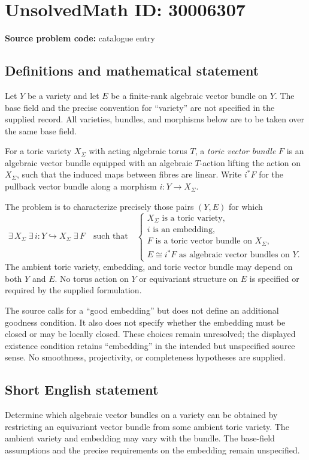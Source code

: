 \documentclass[11pt]{article}
\begin{document}
\section*{UnsolvedMath ID: 30006307}
\textbf{Source problem code:} catalogue entry
\subsection{Definitions and mathematical statement}
Let \(Y\) be a variety and let \(E\) be a finite-rank algebraic vector bundle on \(Y\). The base field and the precise convention for ``variety'' are not specified in the supplied record. All varieties, bundles, and morphisms below are to be taken over the same base field.

For a toric variety \(X_\Sigma\) with acting algebraic torus \(T\), a \emph{toric vector bundle} \(F\) is an algebraic vector bundle equipped with an algebraic \(T\)-action lifting the action on \(X_\Sigma\), such that the induced maps between fibres are linear. Write \(i^*F\) for the pullback vector bundle along a morphism \(i:Y\to X_\Sigma\).

The problem is to characterize precisely those pairs \((Y,E)\) for which
\[
\exists\,X_\Sigma\;\exists\,i:Y\hookrightarrow X_\Sigma\;\exists\,F
\quad\text{such that}\quad
\begin{cases}
X_\Sigma\text{ is a toric variety},\\
i\text{ is an embedding},\\
F\text{ is a toric vector bundle on }X_\Sigma,\\
E\cong i^*F\text{ as algebraic vector bundles on }Y.
\end{cases}
\]
The ambient toric variety, embedding, and toric vector bundle may depend on both \(Y\) and \(E\). No torus action on \(Y\) or equivariant structure on \(E\) is specified or required by the supplied formulation.

The source calls for a ``good embedding'' but does not define an additional goodness condition. It also does not specify whether the embedding must be closed or may be locally closed. These choices remain unresolved; the displayed existence condition retains ``embedding'' in the intended but unspecified source sense. No smoothness, projectivity, or completeness hypotheses are supplied.
\subsection{Short English statement}
Determine which algebraic vector bundles on a variety can be obtained by restricting an equivariant vector bundle from some ambient toric variety. The ambient variety and embedding may vary with the bundle. The base-field assumptions and the precise requirements on the embedding remain unspecified.
\end{document}
